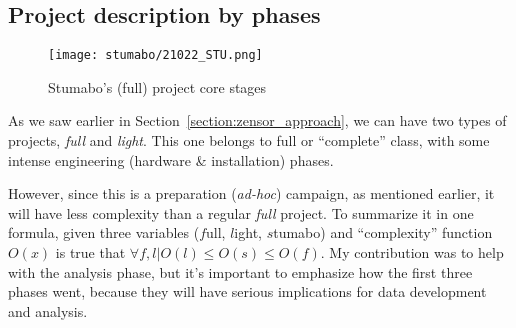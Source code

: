 \subsection{Project description by phases}
\begin{figure}[ht]
    \texttt{[image: stumabo/21022\_STU.png]}
    \caption{Stumabo's (full) project core stages}
    \label{fig:stumabo_stages}
\end{figure}
As we saw earlier in Section~\ref{section:zensor_approach}, we can have two types of projects, \textit{full} and \textit{light}.
This one belongs to full or ``complete'' class, with some intense engineering (hardware \& installation) phases.  
 \\

However, since this is a preparation (\textit{ad-hoc}) campaign, as mentioned earlier, it will have less complexity than a regular \textit{full} project.
To summarize it in one formula, given three variables ($f$ull, $l$ight, $s$tumabo) and ``complexity'' function $O(x)$ is true that $\forall f,l| O(l) \leq O(s) \leq O(f)$.
My contribution was to help with the analysis phase, but it's important to emphasize how the first three phases went, because they will have serious implications for data development and analysis.
